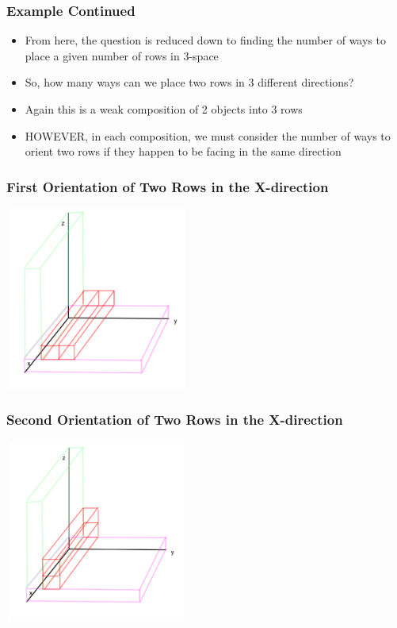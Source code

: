 \documentclass{beamer}
\begin{document}
\begin{frame}
	\frametitle{Example Continued}
	\begin{itemize}
	\item From here, the question is reduced down to finding the number of ways to place a given number of rows in 3-space
	\item So, how many ways can we place two rows in 3 different directions?
	\item Again this is a weak composition of 2 objects into 3 rows
	\item HOWEVER, in each composition, we must consider the number of ways to orient two rows if they happen to be facing in the same direction 
	\end{itemize}
\end{frame}



\begin{frame}
	\frametitle{First Orientation of Two Rows in the X-direction}
	\begin{center}
	\includegraphics[width = 6cm, height = 6cm]{LogMMidtermPresentationImages/2rowsfirstorientation3space.png}
	\end{center}
\end{frame}

\begin{frame}
	\frametitle{Second Orientation of Two Rows in the X-direction}
	\begin{center}
	\includegraphics[width = 6cm, height = 6cm]{LogMMidtermPresentationImages/2rowssecondorientation3space.png}
	\end{center}
\end{frame}
\end{document}
